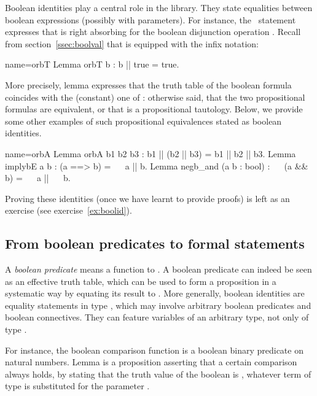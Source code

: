 Boolean identities play a central role in the \mcbMC{} library. They
state equalities between boolean expressions (possibly with parameters).
For
instance, the~ statement expresses that  is right absorbing
for the boolean disjunction operation . Recall from
section~\ref{ssec:boolval} that  is equipped with the \C{||}
infix notation:

\begin{coq}{name=orbT}{}
Lemma orbT b : b || true = true.
\end{coq}

More precisely, lemma 
expresses that the truth table of the boolean formula 
coincides with the (constant) one of : otherwise said, that the
two propositional formulas are equivalent, or that  is a
propositional tautology. Below, we provide some other examples of such
propositional equivalences stated as boolean identities.

\begin{coq}{name=orbA}{}
Lemma orbA b1 b2 b3 : b1 || (b2 || b3) = b1 || b2 || b3.
Lemma implybE a b : (a ==> b) = ~~ a || b.
Lemma negb_and (a b : bool) : ~~ (a && b) = ~~ a || ~~ b.
\end{coq}
Proving these identities (once we have learnt to provide proofs)
is left as an exercise (see
exercise~\ref{ex:boolid}).


\subsection{From boolean predicates to formal statements}
\label{sec:bstatements}

A \emph{boolean predicate} means a function to . A boolean
predicate can indeed be seen as an effective truth table, which can be
used to form a proposition in a systematic way by equating its result
to . More generally, boolean identities are equality statements
in type , which may involve arbitrary boolean predicates and boolean
connectives. They can feature variables of an arbitrary
type, not only of type .

For instance, the boolean comparison function
 is a boolean binary predicate on
natural numbers. Lemma  is a proposition asserting that a
certain comparison always holds, by stating that the truth value of
the boolean  is , whatever term  of type 
is substituted for the parameter .

